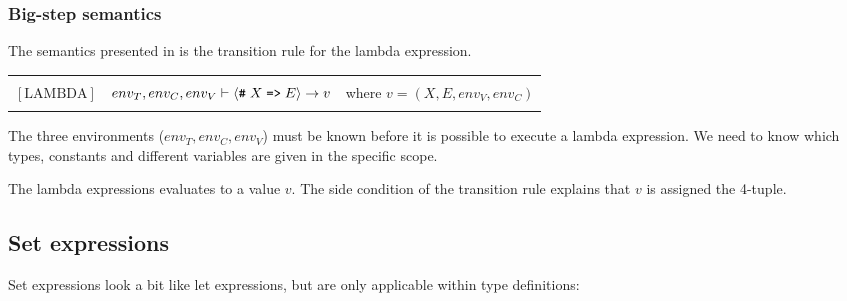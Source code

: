 \begin{ebnf}
\end{ebnf}

\todo{!!!!!!}

\subsubsection{Big-step semantics}

The semantics presented in  is the transition rule for the lambda expression. 

\begin{table}[ht]
  \begin{tabular*}{\textwidth}{l l c}
    \hline \\
    \hspace{0.5cm} $[\mbox{LAMBDA}]$ & $env_{T}, env_{C}, env_{V} \vdash \langle \texttt{\#} \; X\;
    \texttt{=>}\; E \rangle \rightarrow v$ & \hspace{1cm} where $v = \left(X, E, env_{V}, env_{C}\right)$ \\
    & & \\
    \hline
  \end{tabular*}
  \label{semantic:lambda}
\end{table}

The three environments ($env_{T}, env_{C}, env_{V}$) must be known before it is
possible to execute a lambda expression. We need to know which types, constants
and different variables are given in the specific scope.

The lambda expressions evaluates to a value $v$. The side condition of the
transition rule explains that $v$ is assigned the 4-tuple.

\subsection{Set expressions}

Set expressions look a bit like let expressions, but are only applicable within type definitions:

\begin{ebnf}
\end{ebnf}

